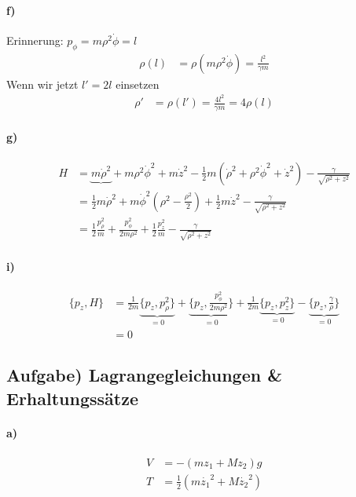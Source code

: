 \documentclass[oneside]{book}
\theoremstyle{definition}
\begin{document}
\paragraph{f)}
Erinnerung: $p_\phi = m \rho^2 \dot{\phi} = l$
\begin{align*}
	\rho(l) &= \rho(m \rho^2 \dot\phi) = \frac{l^2}{\gamma m}
\end{align*}
Wenn wir jetzt $l' = 2 l$ einsetzen
\begin{align*}
	\rho' &= \rho(l') = \frac{4 l^2}{\gamma m} = 4 \rho(l)
\end{align*}
\paragraph{g)}
\begin{align*}
	H &= \underbrace{m \dot{\rho}^2} + m \rho^2\dot{\phi}^2 + m \dot{z}^2 - \frac12 m (\dot{\rho}^2 + \rho^2 \dot{\phi}^2 + \dot{z}^2) - \frac{\gamma}{\sqrt{\rho^2+z^2}}\\
	&= \frac12 m \dot{\rho}^2 + m \dot{\phi}^2 (\rho^2 - \frac{\rho^2}{2}) + \frac12 m \dot{z}^2 - \frac{\gamma}{\sqrt{\rho^2+z^2}}\\
	&= \frac12 \frac{p_\rho^2}{m} + \frac{p_\phi^2}{2 m\rho^2} + \frac12 \frac{p_z^2}{m} - \frac{\gamma}{\sqrt{\rho^2+z^2}}
\end{align*}

\paragraph{i)}
\begin{align*}
	\{p_z, H\} &= \frac1{2m} \underbrace{\{p_z, p_\rho^2\}}_{=0} + \underbrace{\{p_z, \frac{p_\phi^2}{2 m\rho^2}\}}_{=0} + \frac1{2m} \underbrace{\{p_z, p_z^2\}}_{=0} - \underbrace{\{p_z, \frac{\gamma}{\rho}\}}_{=0}\\
	&= 0
\end{align*}


\subsection{Aufgabe) Lagrangegleichungen \& Erhaltungssätze}
\paragraph{a)}
\begin{align*}
	V &= - (mz_1 + Mz_2) g\\
	T &= \frac12 (m \dot{z_1}^2 + M \dot{z_2}^2) 
\end{align*}
\end{document}
